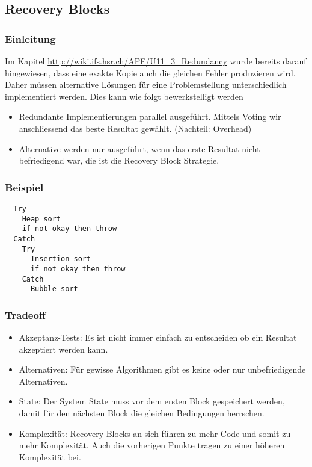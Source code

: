 \subsection{Recovery Blocks}


\subsubsection*{Einleitung}

Im Kapitel \url{http://wiki.ifs.hsr.ch/APF/U11_3_Redundancy} wurde bereits darauf hingewiesen, dass eine exakte Kopie auch die gleichen Fehler produzieren wird. Daher müssen alternative Lösungen für eine Problemstellung unterschiedlich implementiert werden. Dies kann wie folgt bewerkstelligt werden
\begin{itemize}
	\item Redundante Implementierungen parallel ausgeführt. Mittels Voting wir anschliessend das beste Resultat gewählt. (Nachteil: Overhead)
	\item Alternative werden nur ausgeführt, wenn das erste Resultat nicht befriedigend war, die ist die Recovery Block Strategie.
\end{itemize}

\subsubsection*{Beispiel}

\begin{verbatim}
  Try
    Heap sort
    if not okay then throw
  Catch
    Try
      Insertion sort
      if not okay then throw
    Catch
      Bubble sort
\end{verbatim}

\subsubsection*{Tradeoff}

\begin{itemize}
	\item Akzeptanz-Tests: Es ist nicht immer einfach zu entscheiden ob ein Resultat akzeptiert werden kann.
	\item Alternativen: Für gewisse Algorithmen gibt es keine oder nur unbefriedigende Alternativen.
	\item State: Der System State muss vor dem ersten Block gespeichert werden, damit für den nächsten Block die gleichen Bedingungen herrschen.
	\item Komplexität: Recovery Blocks an sich führen zu mehr Code und somit zu mehr Komplexität. Auch die vorherigen Punkte tragen zu einer höheren Komplexität bei.
\end{itemize}

